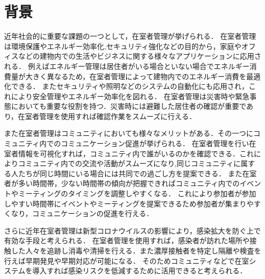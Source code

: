 





\section{背景}\label{1.1}
近年社会的に重要な課題の一つとして，在室者管理が挙げられる．
在室者管理は環境保護やエネルギー効率化,セキュリティ強化などの目的から，家庭やオフィスなどの建物内での生活やビジネスに関する様々なアプリケーションに応用される．
例えばエネルギー管理は居住者がいる場合といない場合でエネルギー消費量が大きく異なるため，在室者管理によって建物内でのエネルギー消費を最適化できる．
またセキュリティや照明などのシステムの自動化にも応用され，これにより安全管理やエネルギー効率化を図れる．
在室者管理は災害時や緊急事態においても重要な役割を持つ．災害時には避難した居住者の確認が重要であり，在室者管理を使用すれば確認作業をスムーズに行える．

また在室者管理はコミュニティにおいても様々なメリットがある．その一つにコミュニティ内でのコミュニケーション促進が挙げられる．
在室者管理を行い在室者情報を可視化すれば，コミュニティ内で誰がいるのかを確認できる．これによりコミュニティ内での交流や活動がスムーズになり,同じコミュニティに属する人たちが同じ時間にいる場合には共同での過ごし方を提案できる．
また在室者が多い時間帯，少ない時間帯の傾向が把握できればコミュニティ内でのイベントやミーティングのタイミングを調整しやすくなる．
これにより参加者が参加しやすい時間帯にイベントやミーティングを提案できるため参加者が集まりやすくなり，コミュニケーションの促進を行える．

さらに近年在室者管理は新型コロナウイルスの影響により，感染拡大を防ぐ上で有効な手段と考えられる．
在室者管理を使用すれば，感染者が訪れた場所や接触した人々を追跡し消毒や清掃を行える．また濃厚接触者を特定し隔離や検査を行えば早期発見や早期対応が可能になる．
そのためコミュニティなどで在室システムを導入すれば感染リスクを低減するために活用できると考えられる．

